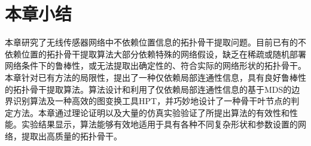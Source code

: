 \section{本章小结}
本章研究了无线传感器网络中不依赖位置信息的拓扑骨干提取问题。目前已有的不依赖位置的拓扑骨干提取算法大部分依赖特殊的网络假设，缺乏在稀疏或随机部署网络条件下的鲁棒性，或无法提取出确定性的、符合实际的网络形状的拓扑骨干。本章针对已有方法的局限性，提出了一种仅依赖局部连通性信息，具有良好鲁棒性的拓扑骨干提取算法。算法设计和利用了仅依赖局部连通性信息的基于MDS的边界识别算法及一种高效的图变换工具HPT，并巧妙地设计了一种骨干叶节点的判定方法。本章通过理论证明以及大量的仿真实验验证了所提出算法的有效性和性能。实验结果显示，算法能够有效地适用于具有各种不同复杂形状和参数设置的网络，提取出高质量的拓扑骨干。
